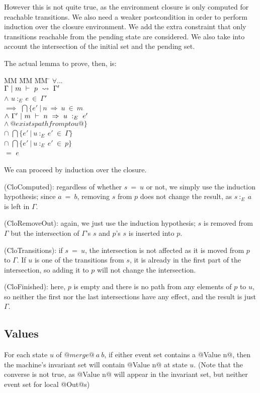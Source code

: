 However this is not quite true, as the environment closure is only computed for reachable transitions.
We also need a weaker postcondition in order to perform induction over the closure environment.
We add the extra constraint that only transitions reachable from the pending state are considered.
We also take into account the intersection of the initial set and the pending set.

The actual lemma to prove, then, is:

\begin{tabbing}
MM \= MM \= MM \= \kill
$\forall...$ \\
\>          \> $\Gamma ~|~ m ~\vdash~ p ~\rightsquigarrow~ \Gamma'$ \\
\> $\wedge$ \> $u~:_E~e~\in~\Gamma'$ \\
\> $\implies$\> $\bigcap\{e'~|~n~\Rightarrow~u~\in~m$ \\
\>           \>         \> $\wedge~\Gamma' ~|~ m ~\vdash~ n~\Rightarrow~u ~:_E~ e'$ \\
\>           \>         \> $\wedge~@exists path from p to u@\}$ \\
\> $\cap$ \> $\bigcap\{e' ~|~ u~:_E~e'~\in~\Gamma \} $ \\
\> $\cap$ \> $\bigcap\{e' ~|~ u~:_E~e'~\in~p \} $ \\
\> $=$       \> $e$
\end{tabbing}

We can proceed by induction over the closure.

(CloComputed):
regardless of whether $s~=~u$ or not, we simply use the induction hypothesis; since $a~=~b$, removing $s$ from $p$ does not change the result, as $s~:_E~a$ is left in $\Gamma$.

(CloRemoveOut):
again, we just use the induction hypothesis;
$s$ is removed from $\Gamma$ but the intersection of $\Gamma$'s $s$ and $p$'s $s$ is inserted into $p$.

(CloTransitions):
if $s~=~u$, the intersection is not affected as it is moved from $p$ to $\Gamma$.
If $u$ is one of the transitions from $s$, it is already in the first part of the intersection, so adding it to $p$ will not change the intersection.

(CloFinished):
here, $p$ is empty and there is no path from any elements of $p$ to $u$, so neither the first nor the last intersections have any effect, and the result is just $\Gamma$.

\subsection{Values}
For each state $u$ of $@merge@~a~b$, if either event set contains a @Value n@, then the machine's invariant set will contain @Value n@ at state $u$.
(Note that the converse is not true, as @Value n@ will appear in the invariant set, but neither event set for local @Out@s)

